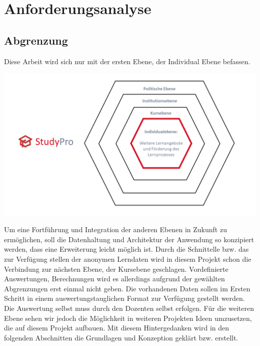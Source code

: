 \chapter{Anforderungsanalyse} %
\section{Abgrenzung}
Diese Arbeit wird sich nur mit der ersten Ebene, der Individual Ebene befassen. 

\includegraphics[width=\linewidth,keepaspectratio]{img/Ebenen}

Um eine Fortführung und Integration der anderen Ebenen in Zukunft zu ermöglichen, soll die Datenhaltung und Architektur der Anwendung so konzipiert werden, dass eine Erweiterung leicht möglich ist.
Durch die Schnittelle bzw. das zur Verfügung stellen der anonymen Lerndaten wird in diesem Projekt schon die Verbindung zur nächsten Ebene, der Kursebene geschlagen.
Vordefinierte Auswertungen, Berechnungen wird es allerdings aufgrund der gewählten Abgrenzungen erst einmal nicht geben.
Die vorhandenen Daten sollen im Ersten Schritt in einem auswertungstauglichen Format zur Verfügung gestellt werden.
Die Auswertung selbst muss durch den Dozenten selbst erfolgen.
Für die weiteren Ebene sehen wir jedoch die Möglichkeit in weiteren Projekten Ideen umzusetzen, die auf diesem Projekt aufbauen.
Mit diesem Hintergedanken wird in den folgenden Abschnitten die Grundlagen und Konzeption geklärt bzw. erstellt.

